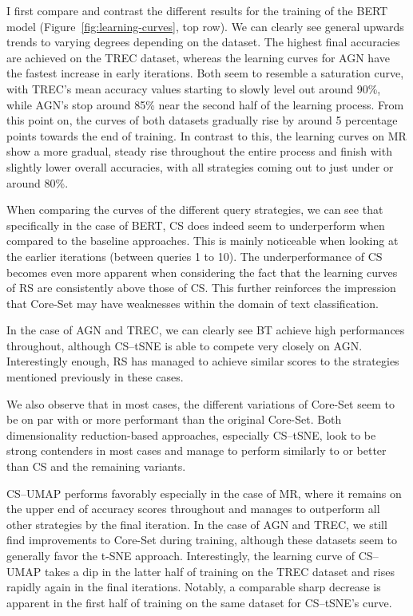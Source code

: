 \documentclass[english,bachelor,ul]{webisthesis} %
\begin{document}
I first compare and contrast the different results for the training of the BERT model (Figure~\ref{fig:learning-curves}, top row). We can clearly see general upwards trends to varying degrees depending on the dataset. The highest final accuracies are achieved on the TREC dataset, whereas the learning curves for AGN have the fastest increase in early iterations. Both seem to resemble a saturation curve, with TREC's mean accuracy values starting to slowly level out around 90\%, while AGN's stop around 85\% near the second half of the learning process. From this point on, the curves of both datasets gradually rise by around 5 percentage points towards the end of training. In contrast to this, the learning curves on MR show a more gradual, steady rise throughout the entire process and finish with slightly lower overall accuracies, with all strategies coming out to just under or around 80\%. 

When comparing the curves of the different query strategies, we can see that specifically in the case of BERT, CS does indeed seem to underperform when compared to the baseline approaches. This is mainly noticeable when looking at the earlier iterations (between queries 1 to 10). The underperformance of CS becomes even more apparent when considering the fact that the learning curves of RS are consistently above those of CS. This further reinforces the impression that Core-Set may have weaknesses within the domain of text classification. 

In the case of AGN and TREC, we can clearly see BT achieve high performances throughout, although CS--tSNE is able to compete very closely on AGN. Interestingly enough, RS has managed to achieve similar scores to the strategies mentioned previously in these cases.

We also observe that in most cases, the different variations of Core-Set seem to be on par with or more performant than the original Core-Set. Both dimensionality reduction-based approaches, especially CS--tSNE, look to be strong contenders in most cases and manage to perform similarly to or better than CS and the remaining variants. 

CS--UMAP performs favorably especially in the case of MR, where it remains on the upper end of accuracy scores throughout and manages to outperform all other strategies by the final iteration. In the case of AGN and TREC, we still find improvements to Core-Set during training, although these datasets seem to generally favor the t-SNE approach. Interestingly, the learning curve of CS--UMAP takes a dip in the latter half of training on the TREC dataset and rises rapidly again in the final iterations. Notably, a comparable sharp decrease is apparent in the first half of training on the same dataset for CS--tSNE's curve.
\end{document}

